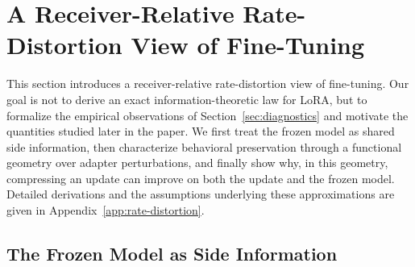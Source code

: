\section{A Receiver-Relative Rate-Distortion View of Fine-Tuning}
\label{sec:information_theory}



This section introduces a receiver-relative rate-distortion view of fine-tuning. Our goal is not to derive an exact information-theoretic law for LoRA, but to formalize the empirical observations of Section~\ref{sec:diagnostics} and motivate the quantities studied later in the paper. We first treat the frozen model as shared side information, then characterize behavioral preservation through a functional geometry over adapter perturbations, and finally show why, in this geometry, compressing an update can improve on both the update and the frozen model. Detailed derivations and the assumptions underlying these approximations are given in Appendix~\ref{app:rate-distortion}.

\subsection{The Frozen Model as Side Information}

